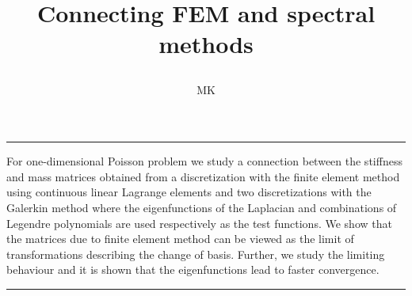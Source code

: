 \documentclass[a4paper,10pt]{article}
\renewenvironment{abstract}{%
\hfill\begin{minipage}{0.95\textwidth}
\rule{\textwidth}{1pt}}
{\par\noindent\rule{\textwidth}{1pt}\end{minipage}}
\begin{document}
%
\title{\begin{center}
        Connecting FEM and spectral methods
       \end{center}}
\author[1]{MK}
%
\maketitle
%
\begin{abstract}
  For one-dimensional Poisson problem we study a connection between the
  stiffness and mass matrices obtained from a discretization with the finite
  element method using continuous linear Lagrange elements and two discretizations
  with the Galerkin method where the eigenfunctions of the Laplacian and
  combinations of Legendre polynomials are used respectively as the test
  functions. We show that the matrices due to finite element method can be viewed
  as the limit of transformations describing the change of basis. Further, we
  study the limiting behaviour and it is shown that the eigenfunctions lead to
  faster convergence.
\end{abstract}
\end{document}
